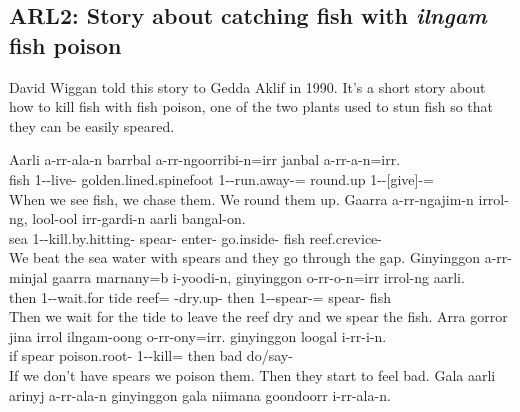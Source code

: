 \subsection{ARL2: Story about catching fish with \emph{ilngam} fish poison}
David Wiggan told this story to Gedda Aklif in 1990. It's a short story about how to kill fish with  fish poison, one of the two plants used to stun fish so that they can be easily speared.%

\setcounter{exxy}{0}\begin{exye}
\exy {}
\gll Aarli a-rr-ala-n barrbal a-rr-ngoorribi-n=irr janbal a-rr-a-n=irr.\\
fish 1--live- golden.lined.spinefoot 1--run.away-= round.up 1--[give]-=\\
\ft When we see  fish, we chase them. We round them up. 
\exy {}
\gll Gaarra a-rr-ngajim-n irrol-ng, lool-ool irr-gardi-n aarli bangal-on.\\
sea 1--kill.by.hitting- spear- enter- go.inside- fish reef.crevice-\\
\ft We beat the sea water with spears and they go through the gap.
\newpage\exy {}
\gll Ginyinggon a-rr-minjal gaarra marnany=b i-yoodi-n, ginyinggon o-rr-o-n=irr irrol-ng aarli.\\
then 1--wait.for tide reef= -dry.up- then 1--spear-= spear- fish\\
\ft Then we wait for the tide to leave the reef dry and we spear the fish.
\exy {}
\gll Arra gorror jina irrol ilngam-oong o-rr-ony=irr. ginyinggon loogal i-rr-i-n.\\
 if  spear poison.root- 1--kill= then bad do/say-\\
\ft If we don't have spears we poison them. Then they start to feel bad. 
\exy {}
\gll Gala aarli arinyj a-rr-ala-n ginyinggon gala niimana goondoorr i-rr-ala-n.\\

\end{exye}
